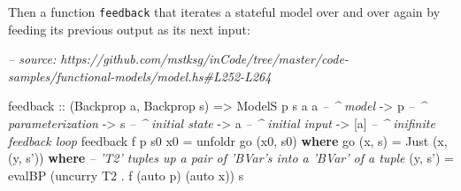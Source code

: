 \documentclass[]{article}
\newenvironment{Shaded}{}{}
\newcommand{\CommentTok}[1]{\textcolor[rgb]{0.38,0.63,0.69}{\textit{#1}}}
\newcommand{\DataTypeTok}[1]{\textcolor[rgb]{0.56,0.13,0.00}{#1}}
\newcommand{\FunctionTok}[1]{\textcolor[rgb]{0.02,0.16,0.49}{#1}}
\newcommand{\KeywordTok}[1]{\textcolor[rgb]{0.00,0.44,0.13}{\textbf{#1}}}
\newcommand{\NormalTok}[1]{#1}
\newcommand{\OtherTok}[1]{\textcolor[rgb]{0.00,0.44,0.13}{#1}}
\begin{document}
\begin{Shaded}
\end{Shaded}

Then a function \texttt{feedback} that iterates a stateful model over and over
again by feeding its previous output as its next input:

\begin{Shaded}
\begin{Highlighting}[]
\CommentTok{-- source: https://github.com/mstksg/inCode/tree/master/code-samples/functional-models/model.hs#L252-L264}

\NormalTok{feedback}
\OtherTok{    ::}\NormalTok{ (}\DataTypeTok{Backprop}\NormalTok{ a, }\DataTypeTok{Backprop}\NormalTok{ s)}
    \OtherTok{=>} \DataTypeTok{ModelS}\NormalTok{ p s a a     }\CommentTok{-- ^ model}
    \OtherTok{->}\NormalTok{ p                  }\CommentTok{-- ^ parameterization}
    \OtherTok{->}\NormalTok{ s                  }\CommentTok{-- ^ initial state}
    \OtherTok{->}\NormalTok{ a                  }\CommentTok{-- ^ initial input}
    \OtherTok{->}\NormalTok{ [a]                }\CommentTok{-- ^ inifinite feedback loop}
\NormalTok{feedback f p s0 x0 }\FunctionTok{=}\NormalTok{ unfoldr go (x0, s0)}
  \KeywordTok{where}
\NormalTok{    go (x, s) }\FunctionTok{=} \DataTypeTok{Just}\NormalTok{ (x, (y, s'))}
      \KeywordTok{where}
        \CommentTok{-- 'T2' tuples up a pair of 'BVar's into a 'BVar' of a tuple}
\NormalTok{        (y, s') }\FunctionTok{=}\NormalTok{ evalBP (uncurry }\DataTypeTok{T2} \FunctionTok{.}\NormalTok{ f (auto p) (auto x)) s}
\end{Highlighting}
\end{Shaded}
\end{document}
